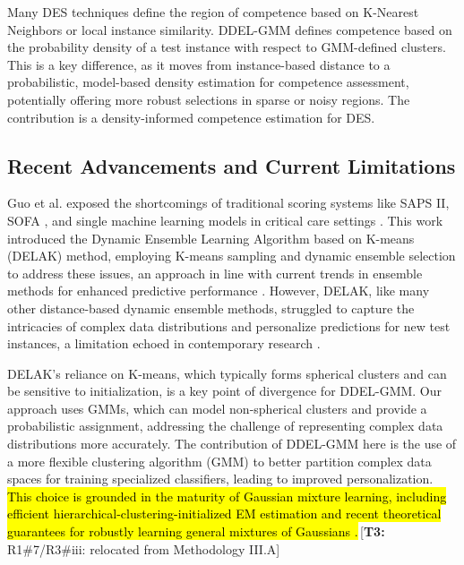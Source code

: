 \documentclass[lettersize,journal]{IEEEtran}
\newcommand{\greenhighlight}[1]{\textcolor{highlightgreen}{#1}}
\newcommand{\tchange}[2]{\hl{#1}\,\textcolor{tier3note}{\footnotesize[\textbf{T3:} #2]}}
\begin{document}
\greenhighlight{Many DES techniques define the region of competence based on K-Nearest Neighbors or local instance similarity. DDEL-GMM defines competence based on the probability density of a test instance with respect to GMM-defined clusters. This is a key difference, as it moves from instance-based distance to a probabilistic, model-based density estimation for competence assessment, potentially offering more robust selections in sparse or noisy regions. The contribution is a density-informed competence estimation for DES.}

\subsection{Recent Advancements and Current Limitations}
\noindent Guo et al. \cite{guo_dynamic_2021} exposed the shortcomings of traditional scoring systems like SAPS II, SOFA \cite{tekin_comparison_2024}, and single machine learning models in critical care settings \cite{sagi_ensemble_2018}. This work introduced the Dynamic Ensemble Learning Algorithm based on K-means (DELAK) method, employing K-means sampling and dynamic ensemble selection to address these issues, an approach in line with current trends in ensemble methods for enhanced predictive performance \cite{dong_survey_2020, jiang_clustering-based_2019}. However, DELAK, like many other distance-based dynamic ensemble methods, struggled to capture the intricacies of complex data distributions and personalize predictions for new test instances, a limitation echoed in contemporary research \cite{mienye_survey_2022, gonzalez_practical_2020}. 

\greenhighlight{DELAK's reliance on K-means, which typically forms spherical clusters and can be sensitive to initialization, is a key point of divergence for DDEL-GMM. Our approach uses GMMs, which can model non-spherical clusters and provide a probabilistic assignment, addressing the challenge of representing complex data distributions more accurately. The contribution of DDEL-GMM here is the use of a more flexible clustering algorithm (GMM) to better partition complex data spaces for training specialized classifiers, leading to improved personalization.} \tchange{This choice is grounded in the maturity of Gaussian mixture learning, including efficient hierarchical-clustering-initialized EM estimation \mbox{\cite{li_gaussian_2018}} and recent theoretical guarantees for robustly learning general mixtures of Gaussians \mbox{\cite{liu_robustly_2023}}.}{R1\#7/R3\#iii: relocated from Methodology III.A}
\end{document}

